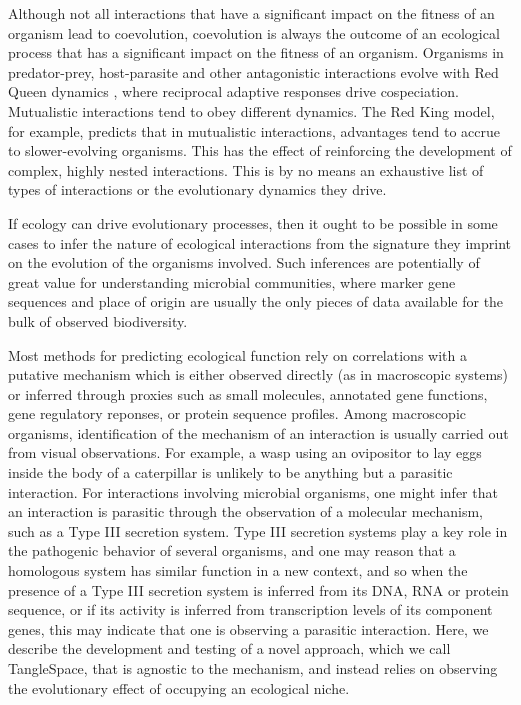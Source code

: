 Although not all interactions that have a significant impact on the fitness of an organism lead to coevolution, coevolution is always the outcome of an ecological process that has a significant impact on the fitness of an organism. Organisms in predator-prey, host-parasite and other antagonistic interactions evolve with Red Queen dynamics \cite{van1973new, gibson2015phylogenetic}, where reciprocal adaptive responses drive cospeciation. Mutualistic interactions tend to obey different dynamics. The Red King model, \cite{bergstrom2003red, gokhale2012mutualism} for example, predicts that in mutualistic interactions, advantages tend to accrue to slower-evolving organisms. This has the effect of reinforcing the development of complex, highly nested interactions. \cite{bastolla2009architecture, rezende2007non} This is by no means an exhaustive list of types of interactions or the evolutionary dynamics they drive. 

If ecology can drive evolutionary processes, then it ought to be possible in some cases to infer the nature of ecological interactions from the signature they imprint on the evolution of the organisms involved. Such inferences are potentially of great value for understanding microbial communities, where marker gene sequences and place of origin are usually the only pieces of data available for the bulk of observed biodiversity.

Most methods for predicting ecological function rely on correlations with a putative mechanism which is either observed directly (as in macroscopic systems) or inferred through proxies such as small molecules, \cite{larsen2015predicting, sardans2011ecological, bundy2009environmental} annotated gene functions, \cite{jiang2012functional, bik2014deciphering} gene regulatory reponses, \cite{mason2012metagenome, urich2008simultaneous, gifford2013expression} or protein sequence profiles. \cite{wang2016environmental} Among macroscopic organisms, identification of the mechanism of an interaction is usually carried out from visual observations. For example, a wasp using an ovipositor to lay eggs inside the body of a caterpillar is unlikely to be anything but a parasitic interaction. For interactions involving microbial organisms, one might infer that an interaction is parasitic through the observation of a molecular mechanism, such as a Type III secretion system. Type III secretion systems play a key role in the pathogenic behavior of several organisms, and one may reason that a homologous system has similar function in a new context, and so when the presence of a Type III secretion system is inferred from its DNA, RNA or protein sequence, or if its activity is inferred from transcription levels of its component genes, this may indicate that one is observing a parasitic interaction. Here, we describe the development and testing of a novel approach, which we call TangleSpace, that is agnostic to the mechanism, and instead relies on observing the evolutionary effect of occupying an ecological niche.

